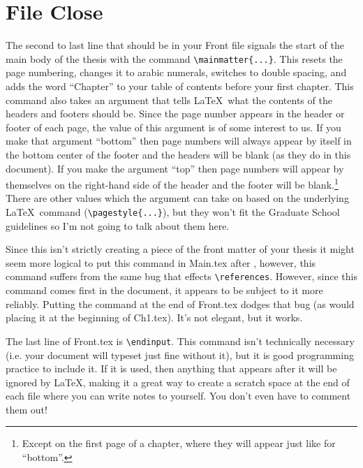 \section{File Close}
The second to last line that should be in your Front file signals the start of the main body of the thesis with the command \verb=\mainmatter{...}=.  This resets the page numbering, changes it to arabic numerals, switches to double spacing, and adds the word ``Chapter'' to your table of contents before your first chapter.  This command also takes an argument that tells \LaTeX\ what the contents of the headers and footers should be.  Since the page number appears in the header or footer of each page, the value of this argument is of some interest to us. If you make that argument ``bottom'' then page numbers will always appear by itself in the bottom center of the footer and the headers will be blank (as they do in this document).  If you make the argument ``top'' then page numbers will appear by themselves on the right-hand side of the header and the footer will be blank.\footnote{Except on the first page of a chapter, where they will appear just like for ``bottom''.}    There are other values which the argument can take on based on the underlying \LaTeX\ command (\verb=\pagestyle{...}=), but they won't fit the Graduate School guidelines so I'm not going to talk about them here.

Since this isn't strictly creating a piece of the front matter of your thesis it might seem more logical to put this command in Main.tex after \verb==, however, this command suffers from the same bug that effects \verb=\references=.  However, since this command comes first in the document, it appears to be subject to it more reliably.  Putting the command at the end of Front.tex dodges that bug (as would placing it at the beginning of Ch1.tex).  It's not elegant, but it works.

The last line of Front.tex is \verb=\endinput=.  This command isn't technically necessary (i.e. your document will typeset just fine without it), but it is good programming practice to include it.  If it is used, then anything that appears after it will be ignored by \LaTeX, making it a great way to create a scratch space at the end of each file where you can write notes to yourself.  You don't even have to comment them out!
\endinput

This is a note to myself which is ignored by LaTeX due to the \endinput command above it.